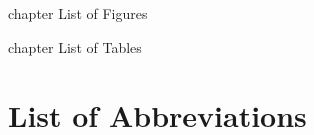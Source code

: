 \documentclass[12pt,a4paper]{report}                      %
\begin{document}
\frontmatter



% 

\contentsandlists
\newpage
\listoffigures
{} {chapter} {List of Figures}
\newpage
\listoftables
{} {chapter} {List of Tables}
\newpage
\chapter*{List of Abbreviations}

\mainmatter




\backmatter


\appendix




\end{document}
